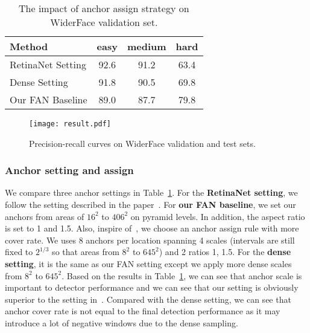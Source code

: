 \documentclass[10pt,twocolumn,letterpaper]{article}
\begin{document}
\begin{table}[h]
\begin{center}
\begin{tabular}{|l|c|c|c|}
\hline
Method & easy & medium & hard \\
\hline
RetinaNet Setting & 92.6 & 91.2 & 63.4 \\
Dense Setting & 91.8 & 90.5 & 69.8 \\
Our FAN Baseline & 89.0 & 87.7 & 79.8 \\
\hline
\end{tabular}
\end{center}
\caption{The impact of anchor assign strategy on WiderFace validation set.}
\label{table: anchor setting}
\end{table}

\begin{figure*}[t]
\begin{center}
    \texttt{[image: result.pdf]}
\end{center}
    \caption{Precision-recall curves on WiderFace validation and test sets.} 
\label{fig:pr_curve}
\end{figure*}

\subsubsection{Anchor setting and assign}

We compare three anchor settings in Table~\ref{table: anchor setting}. For the \textbf{RetinaNet setting}, we follow the setting described in the paper~\cite{lin2017focal}. For \textbf{our FAN baseline}, we set our anchors from areas of $ 16^2 $ to $ 406^2 $ on pyramid levels. In addition, the aspect ratio is set to 1 and 1.5. Also, inspire of~\cite{zhang2017s3fd}, we choose an anchor assign rule with more cover rate. We uses 8 anchors per location spanning 4 scales (intervals are still fixed to $ 2^{1/3} $ so that areas from $ 8^2 $ to $ 645^2 $) and 2 ratios {1, 1.5}.  For the \textbf{dense setting}, it is the same as our FAN setting except we apply more dense scales from $ 8^2 $ to $ 645^2 $. Based on the results in Table~\ref{table: anchor setting}, we can see that anchor scale is important to detector performance and we can see that our setting is obviously superior to the setting in~\cite{lin2017focal}. Compared with the dense setting, we can see that anchor cover rate is not equal to the final detection performance as it may introduce a lot of negative windows due to the dense sampling.
\end{document}
